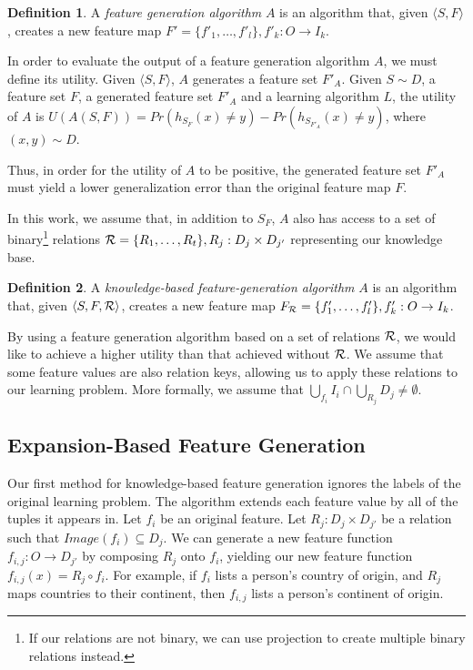 \documentclass[twoside,11pt]{article}
\theoremstyle{definition}
\newtheorem{defn}{Definition}[section]
\begin{document}
\begin{defn}
	A \emph{feature generation algorithm} $A$ is an algorithm that, given $\langle S,F\rangle$, creates a new feature map $F'=\{f'_{1},\ldots,f'_{l}\}, f'_{k}:O\rightarrow I_k$.
\end{defn}

In order to evaluate the output of a feature generation algorithm $A$, we must define its utility. Given $\langle S,F \rangle$, $A$ generates a feature set $F'_A$.
Given $S\sim D$, a feature set $F$, a generated feature set $F'_A$ and a learning algorithm $L$, the utility of $A$ is $U(A(S,F))=Pr(h_{S_F}(x)\neq y)-Pr(h_{S_{F'_A}}(x)\neq y)$, where $(x,y)\sim D$.

Thus, in order for the utility of $A$ to be positive, the generated feature set $F'_A$ must yield a lower generalization error than the original feature map $F$.

In this work, we assume that, in addition to $S_F$, $A$ also has access to a set of binary\footnote{If our relations are not binary, we can use projection to create multiple binary relations instead.} relations ${\cal R}=\{R_{1},\ldots,R_{t}\}, R_j:D_j\times D_{j'}$ representing our knowledge base. 
\begin{defn}
	A \emph{knowledge-based feature-generation algorithm} $A$ is an algorithm that, given $\langle S,F,{\cal R} \rangle$, creates a new feature map $F_{{\cal R}}=\{f'_{1},\ldots,f'_{l}\}, f'_{k}:O\rightarrow I_k$.
\end{defn}

By using a feature generation algorithm based on a set of relations ${\cal R}$, we would like to achieve a higher utility than that achieved without ${\cal R}$. We assume that some feature values are also relation keys, allowing us to apply these relations to our learning problem. More formally, we assume that
$\bigcup_{f_i} I_i \cap \bigcup_{R_j} D_j \neq \emptyset$. 

\subsection{Expansion-Based Feature Generation} \label{shallow_section}

Our first method for knowledge-based feature generation ignores the labels of the original learning problem.
The algorithm extends each feature value by all of the tuples it appears in.
Let $f_i$ be an original feature. Let $R_j:D_j\times D_{j'}$ be a relation such that  $Image(f_i) \subseteq D_j$. We can generate a new feature function $f_{i,j}:O\rightarrow D_{j'}$ by composing $R_j$ onto $f_i$, yielding our new feature function  $f_{i,j}(x)=R_j\circ f_i$. For example, if $f_i$ lists a person's country of origin, and $R_j$ maps countries to their continent, then $f_{i,j}$ lists a person's continent of origin.
\end{document}

